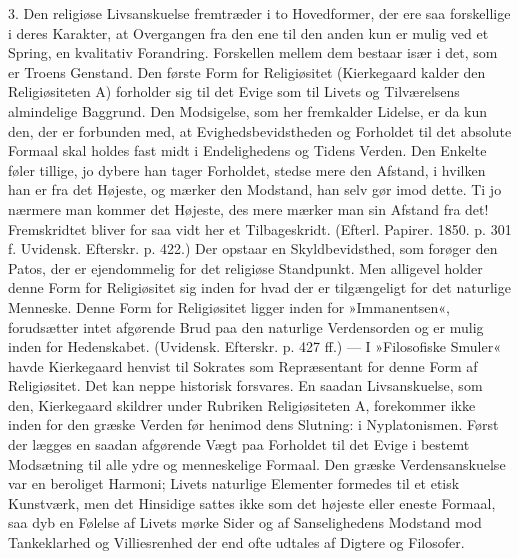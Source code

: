 \documentclass[12pt,a4paper,openany]{book}
\newcommand{\opage}[1]{\marginnote{\footnotesize\textit{[#1]}}}
\begin{document}
3. Den religiøse Livsanskuelse fremtræder i to
Hovedformer, der ere saa forskellige i deres Karakter,
at Overgangen fra den ene til den anden kun er mulig
ved et Spring, en kvalitativ Forandring. Forskellen mellem
dem bestaar især i det, som er Troens Genstand.
Den første Form for Religiøsitet (Kierkegaard kalder den
Religiøsiteten A) forholder sig til det Evige som til Livets
og Tilværelsens almindelige Baggrund. Den Modsigelse,
som her fremkalder Lidelse, er da kun den, der er forbunden
med, at Evighedsbevidstheden og Forholdet til
det absolute Formaal skal holdes fast midt i Endelighedens
og Tidens Verden. Den Enkelte føler tillige, jo
dybere han tager Forholdet, stedse mere den Afstand, i
\opage{117}hvilken han er fra det Højeste, og mærker den Modstand,
han selv gør imod dette. Ti jo nærmere man kommer det
Højeste, des mere mærker man sin Afstand fra det!
Fremskridtet bliver for saa vidt her et Tilbageskridt.
(Efterl. Papirer. 1850. p. 301 f. Uvidensk. Efterskr.
p. 422.) Der opstaar en Skyldbevidsthed, som forøger
den Patos, der er ejendommelig for det religiøse Standpunkt.
Men alligevel holder denne Form for Religiøsitet
sig inden for hvad der er tilgængeligt for det naturlige
Menneske. Denne Form for Religiøsitet ligger inden for
»Immanentsen«, forudsætter intet afgørende Brud paa den
naturlige Verdensorden og er mulig inden for Hedenskabet.
(Uvidensk. Efterskr. p. 427 ff.) --- I »Filosofiske
Smuler« havde Kierkegaard henvist til Sokrates som Repræsentant
for denne Form af Religiøsitet. Det kan
neppe historisk forsvares. En saadan Livsanskuelse, som
den, Kierkegaard skildrer under Rubriken Religiøsiteten
A, forekommer ikke inden for den græske Verden før
henimod dens Slutning: i Nyplatonismen. Først der
lægges en saadan afgørende Vægt paa Forholdet til det
Evige i bestemt Modsætning til alle ydre og menneskelige
Formaal. Den græske Verdensanskuelse var en beroliget
Harmoni; Livets naturlige Elementer formedes til
et etisk Kunstværk, men det Hinsidige sattes ikke som
det højeste eller eneste Formaal, saa dyb en Følelse af
Livets mørke Sider og af Sanselighedens Modstand mod
Tankeklarhed og Villiesrenhed der end ofte udtales af
Digtere og Filosofer.
\end{document}
